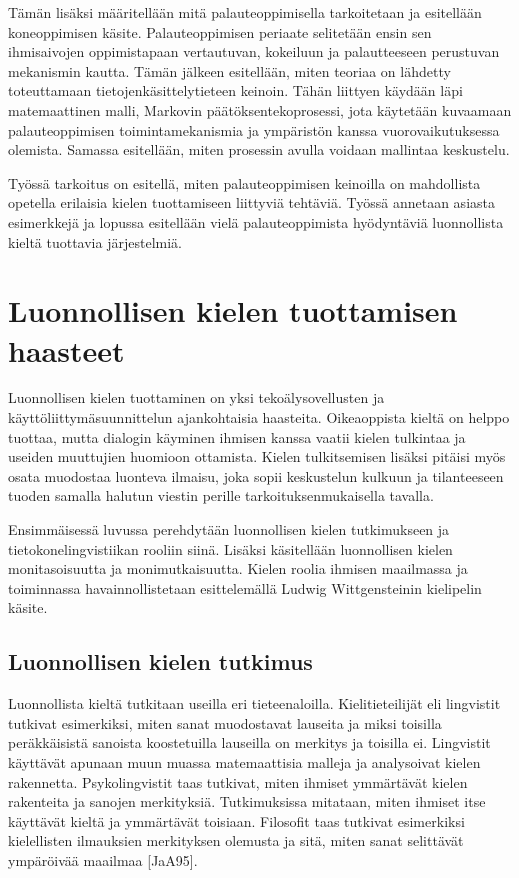 \documentclass[finnish]{tktltiki2}
\theoremstyle{definition}
\theoremstyle{remark}
\begin{document}
Tämän lisäksi määritellään mitä palauteoppimisella tarkoitetaan ja esitellään koneoppimisen käsite. Palauteoppimisen periaate selitetään ensin sen ihmisaivojen oppimistapaan vertautuvan, kokeiluun ja palautteeseen perustuvan mekanismin kautta. Tämän jälkeen esitellään, miten teoriaa on lähdetty toteuttamaan tietojenkäsittelytieteen keinoin. Tähän liittyen käydään läpi matemaattinen malli, Markovin päätöksentekoprosessi, jota käytetään kuvaamaan palauteoppimisen toimintamekanismia ja ympäristön kanssa vuorovaikutuksessa olemista. Samassa esitellään, miten prosessin avulla voidaan mallintaa keskustelu. 

Työssä tarkoitus on esitellä, miten palauteoppimisen keinoilla on mahdollista opetella erilaisia kielen tuottamiseen liittyviä tehtäviä. Työssä annetaan asiasta esimerkkejä ja lopussa esitellään vielä palauteoppimista hyödyntäviä luonnollista kieltä tuottavia järjestelmiä. 
\section{Luonnollisen kielen tuottamisen haasteet}

Luonnollisen kielen tuottaminen on yksi tekoälysovellusten ja käyttöliittymäsuunnittelun ajankohtaisia haasteita. Oikeaoppista kieltä on helppo tuottaa, mutta dialogin käyminen ihmisen kanssa vaatii kielen tulkintaa ja useiden muuttujien huomioon ottamista. Kielen tulkitsemisen lisäksi pitäisi myös osata muodostaa luonteva ilmaisu, joka sopii keskustelun kulkuun ja tilanteeseen tuoden samalla halutun viestin perille tarkoituksenmukaisella tavalla. 

Ensimmäisessä luvussa perehdytään luonnollisen kielen tutkimukseen ja tietokonelingvistiikan rooliin siinä. Lisäksi käsitellään luonnollisen kielen monitasoisuutta ja monimutkaisuutta. Kielen roolia ihmisen maailmassa ja toiminnassa havainnollistetaan esittelemällä Ludwig Wittgensteinin kielipelin käsite.

\subsection{Luonnollisen kielen tutkimus}

Luonnollista kieltä tutkitaan useilla eri tieteenaloilla. Kielitieteilijät eli lingvistit tutkivat esimerkiksi, miten sanat muodostavat lauseita ja miksi toisilla peräkkäisistä sanoista koostetuilla lauseilla on merkitys ja toisilla ei. Lingvistit käyttävät apunaan muun muassa matemaattisia malleja ja analysoivat kielen rakennetta. Psykolingvistit taas tutkivat, miten ihmiset ymmärtävät kielen rakenteita ja sanojen merkityksiä. Tutkimuksissa mitataan, miten ihmiset itse käyttävät kieltä ja ymmärtävät toisiaan. Filosofit taas tutkivat esimerkiksi kielellisten ilmauksien merkityksen olemusta ja sitä, miten sanat selittävät ympäröivää maailmaa [JaA95]. 
 
\end{document}

